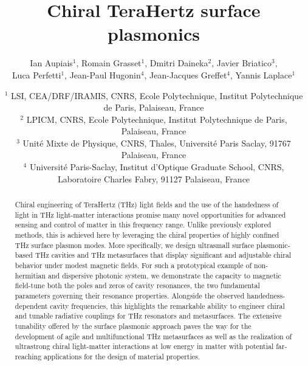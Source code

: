 \documentclass[twocolumn]{article}
\title{Chiral TeraHertz surface plasmonics}
\author{Ian Aupiais$^1$, Romain Grasset$^1$, Dmitri Daineka$^2$, Javier Briatico$^3$, \\  Luca Perfetti$^1$, Jean-Paul Hugonin$^4$, Jean-Jacques Greffet$^4$, Yannis Laplace$^1$}
\date{$^1$ LSI, CEA/DRF/IRAMIS, CNRS, Ecole Polytechnique, Institut Polytechnique de Paris, Palaiseau, France \\$^2$ LPICM, CNRS, Ecole Polytechnique, Institut Polytechnique de Paris, Palaiseau, France \\$^3$ Unit\'{e} Mixte de Physique, CNRS, Thales, Universit\'{e} Paris Saclay, 91767 Palaiseau, France \\ $^4$ Universit\'{e} Paris-Saclay, Institut d'Optique Graduate School, CNRS, Laboratoire Charles Fabry, 91127 Palaiseau, France}
\begin{document}
\maketitle %

\begin{abstract}
 Chiral engineering of TeraHertz (THz) light fields and the use of the handedness of light in THz light-matter interactions promise many novel opportunities for advanced sensing and control of matter in this frequency range. Unlike previously explored methods, this is achieved here by leveraging the chiral properties of highly confined THz surface plasmon modes. More specifically, we design ultrasmall surface plasmonic-based THz cavities and THz metasurfaces that display significant and adjustable chiral behavior under modest magnetic fields. For such a prototypical example of non-hermitian and dispersive photonic system, we demonstrate the capacity to magnetic field-tune both the poles and zeros of cavity resonances, the two fundamental parameters governing their resonance properties.
 Alongside the observed handedness-dependent cavity frequencies, this highlights the remarkable ability to engineer chiral and tunable radiative couplings for THz resonators and metasurfaces. The extensive tunability offered by the surface plasmonic approach paves the way for the development of agile and multifunctional THz metasurfaces as well as the realization of ultrastrong chiral light-matter interactions at low energy in matter with potential far-reaching applications for the design of material properties.
\end{abstract}
\end{document}

